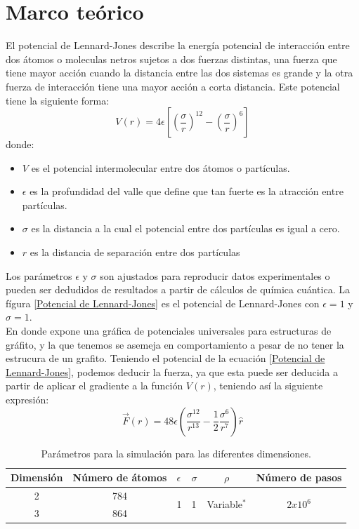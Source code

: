 \documentclass[reprint,amsmath,amssymb,aps,]{revtex4-2}
\begin{document}
\section{Marco teórico}
El potencial de Lennard-Jones describe la energía potencial de interacción entre dos átomos o moleculas netros sujetos a dos fuerzas distintas, una fuerza que tiene mayor acción cuando la distancia entre las dos sistemas es grande y la otra fuerza de interacción tiene una mayor acción a corta distancia. Este potencial tiene la siguiente forma:
\begin{equation}
    \label{Potencial de Lennard-Jones}
    V(r) = 4 \epsilon \left[\left(\frac{\sigma}{r} \right)^{12} - \left(\frac{\sigma}{r} \right)^6 \right]
\end{equation}
donde:
\begin{itemize}
    \item $V$ es el potencial intermolecular entre dos átomos o partículas.
    \item $\epsilon$ es la profundidad del valle que define que tan fuerte es la atracción entre partículas.
    \item $\sigma$ es la distancia a la cual el potencial entre dos partículas es igual a cero.
    \item $r$ es la distancia de separación entre dos partículas
\end{itemize}
Los parámetros $\epsilon$ y $\sigma$ son ajustados para reproducir datos experimentales o pueden ser dedudidos de resultados a partir de cálculos de química cuántica. La fígura \ref{Potencial de Lennard-Jones} es el potencial de Lennard-Jones con $\epsilon=1$ y $\sigma=1$.\\
En donde \cite{Girifalco2000} expone una gráfica de potenciales universales para estructuras de gráfito, y la que tenemos se asemeja en comportamiento a pesar de no tener la estrucura de un grafito.
Teniendo el potencial de la ecuación \ref{Potencial de Lennard-Jones}, podemos deducir la fuerza, ya que esta puede ser deducida a partir de aplicar el gradiente a la función $V(r)$, teniendo así la siguiente expresión:
\begin{equation}
    \label{eq:fuerzateo}
    \vec{F}(r)= 48\epsilon \left(\frac{\sigma^{12}}{r^{13}}- \frac{1}{2}\frac{\sigma^6}{r^7} \right) \hat{r}
\end{equation}\begin{table}
    \centering
    \begin{tabular}{ccp{1cm}p{0.5cm}cc}
        \hline
        Dimensión & Número de átomos & $\epsilon$ & $\sigma $ & $\rho $ & Número de pasos \\ \hline
        2 &784 &\multirow{2}{*}{1} &\multirow{2}{*}{1}  &\multirow{2}{*}{Variable$^{*}$}  &\multirow{2}{*}{$2x10^{6}$}  \\
        3 &864 & & & & \\ \hline
    \end{tabular}
    \caption{Parámetros para la simulación para las diferentes dimensiones.}
    \label{table:parametros}
\end{table}
\end{document}
